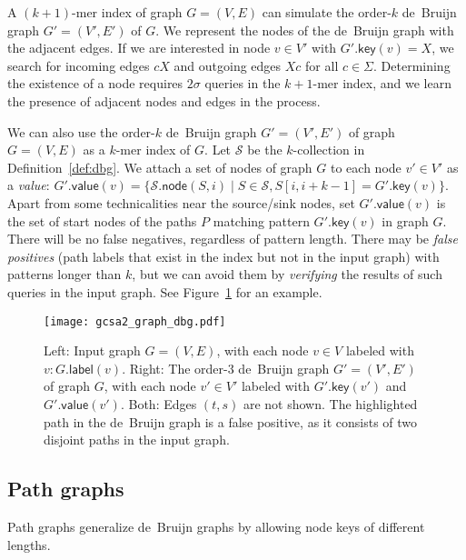 \documentclass[a4paper,UKenglish]{lipics-v2016}
\newcommand{\set}[1]{\ensuremath{\{ #1 \}}}
\newcommand{\glabel}{\ensuremath{\mathsf{label}}}
\newcommand{\gkey}{\ensuremath{\mathsf{key}}}
\newcommand{\gvalue}{\ensuremath{\mathsf{value}}}
\newcommand{\gnode}{\ensuremath{\mathsf{node}}}
\newcommand{\kmer}[1]{$#1$\nobreakdash-mer}
\newcommand{\kcollection}[1]{$#1$\nobreakdash-collection}
\newcommand{\orderk}[1]{order\nobreakdash-$#1$}
\begin{document}
A \kmer{(k+1)} index of graph $G = (V, E)$ can simulate the \orderk{k} de~Bruijn graph $G' = (V', E')$ of $G$. We represent the nodes of the de~Bruijn graph with the adjacent edges. If we are interested in node $v \in V'$ with $G'.\gkey(v) = X$, we search for incoming edges $cX$ and outgoing edges $Xc$ for all $c \in \Sigma$. Determining the existence of a node requires $2 \sigma$ queries in the \kmer{k+1} index, and we learn the presence of adjacent nodes and edges in the process.

We can also use the \orderk{k} de~Bruijn graph $G' = (V', E')$ of graph $G = (V, E)$ as a \kmer{k} index of $G$. Let $\mathcal{S}$ be the \kcollection{k} in Definition~\ref{def:dbg}. We attach a set of nodes of graph $G$ to each node $v' \in V'$ as a \emph{value}: $G'.\gvalue(v) = \set{ \mathcal{S}.\gnode(S, i) \mid S \in \mathcal{S}, S[i, i+k-1] = G'.\gkey(v)}.$ Apart from some technicalities near the source/sink nodes, set $G'.\gvalue(v)$ is the set of start nodes of the paths $P$ matching pattern $G'.\gkey(v)$ in graph $G$. There will be no false negatives, regardless of pattern length. There may be \emph{false positives} (path labels that exist in the index but not in the input graph) with patterns longer than $k$, but we can avoid them by \emph{verifying} the results of such queries in the input graph. See Figure~\ref{figure:graph-dbg} for an example.

\begin{figure}[t!]
\texttt{[image: gcsa2\_graph\_dbg.pdf]}
\caption{Left: Input graph $G = (V, E)$, with each node $v \in V$ labeled with $v:G.\glabel(v)$. Right: The \orderk{3} de~Bruijn graph $G' = (V', E')$ of graph $G$, with each node $v' \in V'$ labeled with $G'.\gkey(v')$ and $G'.\gvalue(v')$. Both: Edges $(t, s)$ are not shown. The highlighted path in the de~Bruijn graph is a false positive, as it consists of two disjoint paths in the input graph.}\label{figure:graph-dbg}
\end{figure}

\subsection{Path graphs}

Path graphs generalize de~Bruijn graphs by allowing node keys of different lengths.
\end{document}

